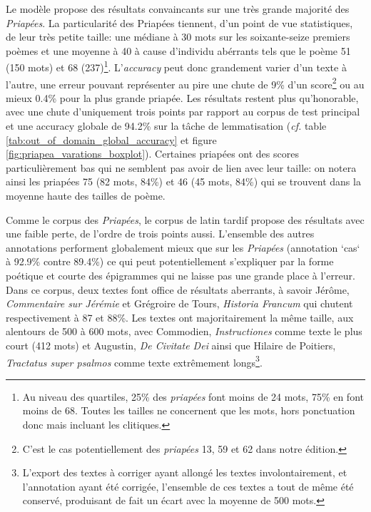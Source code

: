 Le modèle propose des résultats convaincants sur une très grande majorité des \textit{Priapées}. La particularité des Priapées tiennent, d'un point de vue statistiques, de leur très petite taille: une médiane à 30 mots sur les soixante-seize premiers poèmes et une moyenne à 40 à cause d'individu abérrants tels que le poème 51 (150 mots) et 68 (237)\footnote{Au niveau des quartiles, 25\% des \textit{priapées} font moins de 24 mots, 75\% en font moins de 68. Toutes les tailles ne concernent que les mots, hors ponctuation donc mais incluant les clitiques.}. L'\textit{accuracy} peut donc grandement varier d'un texte à l'autre, une erreur pouvant représenter au pire une chute de 9\% d'un score\footnote{C'est le cas potentiellement des \textit{priapées} 13, 59 et 62 dans notre édition.} ou au mieux 0.4\% pour la plus grande priapée. Les résultats restent plus qu'honorable, avec une chute d'uniquement trois points par rapport au corpus de test principal et une accuracy globale de 94.2\% sur la tâche de lemmatisation (\textit{cf.} table \ref{tab:out_of_domain_global_accuracy} et figure \ref{fig:priapea_varations_boxplot}). Certaines priapées ont des scores particulièrement bas qui ne semblent pas avoir de lien avec leur taille: on notera ainsi les priapées 75 (82 mots, 84\%) et 46 (45 mots, 84\%) qui se trouvent dans la moyenne haute des tailles de poème.

Comme le corpus des \textit{Priapées}, le corpus de latin tardif propose des résultats avec une faible perte, de l'ordre de trois points aussi. L'ensemble des autres annotations performent globalement mieux que sur les \textit{Priapées} (annotation `cas` à 92.9\% contre 89.4\%) ce qui peut potentiellement s'expliquer par la forme poétique et courte des épigrammes qui ne laisse pas une grande place à l'erreur. Dans ce corpus, deux textes font office de résultats aberrants, à savoir Jérôme, \textit{Commentaire sur Jérémie} et Grégroire de Tours, \textit{Historia Francum} qui chutent respectivement à 87 et 88\%. Les textes ont majoritairement la même taille, aux alentours de 500 à 600 mots, avec Commodien, \textit{Instructiones} comme texte le plus court (412 mots) et Augustin, \textit{De Civitate Dei} ainsi que Hilaire de Poitiers, \textit{Tractatus super psalmos} comme texte extrêmement longs\footnote{L'export des textes à corriger ayant allongé les textes involontairement, et l'annotation ayant été corrigée, l'ensemble de ces textes a tout de même été conservé, produisant de fait un écart avec la moyenne de 500 mots.}.

